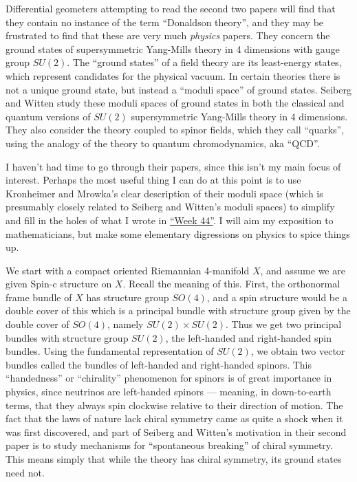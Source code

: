\documentclass{article}
\begin{document}
Differential geometers attempting to read the second two papers will
find that they contain no instance of the term ``Donaldson theory'', and
they may be frustrated to find that these are very much \emph{physics}
papers. They concern the ground states of supersymmetric Yang-Mills
theory in 4 dimensions with gauge group \(SU(2)\). The ``ground states''
of a field theory are its least-energy states, which represent
candidates for the physical vacuum. In certain theories there is not a
unique ground state, but instead a ``moduli space'' of ground states.
Seiberg and Witten study these moduli spaces of ground states in both
the classical and quantum versions of \(SU(2)\) supersymmetric
Yang-Mills theory in 4 dimensions. They also consider the theory coupled
to spinor fields, which they call ``quarks'', using the analogy of the
theory to quantum chromodynamics, aka ``QCD''.

I haven't had time to go through their papers, since this isn't my main
focus of interest. Perhaps the most useful thing I can do at this point
is to use Kronheimer and Mrowka's clear description of their moduli
space (which is presumably closely related to Seiberg and Witten's
moduli spaces) to simplify and fill in the holes of what I wrote in
\protect\hyperlink{week44}{``Week 44''}. I will aim my exposition to
mathematicians, but make some elementary digressions on physics to spice
things up.

We start with a compact oriented Riemannian 4-manifold \(X\), and assume
we are given Spin-c structure on \(X\). Recall the meaning of this.
First, the orthonormal frame bundle of \(X\) has structure group
\(SO(4)\), and a spin structure would be a double cover of this which is
a principal bundle with structure group given by the double cover of
\(SO(4)\), namely \(SU(2) \times SU(2)\). Thus we get two principal
bundles with structure group \(SU(2)\), the left-handed and right-handed
spin bundles. Using the fundamental representation of \(SU(2)\), we
obtain two vector bundles called the bundles of left-handed and
right-handed spinors. This ``handedness'' or ``chirality'' phenomenon
for spinors is of great importance in physics, since neutrinos are
left-handed spinors --- meaning, in down-to-earth terms, that they
always spin clockwise relative to their direction of motion. The fact
that the laws of nature lack chiral symmetry came as quite a shock when
it was first discovered, and part of Seiberg and Witten's motivation in
their second paper is to study mechanisms for ``spontaneous breaking''
of chiral symmetry. This means simply that while the theory has chiral
symmetry, its ground states need not.
\end{document}
